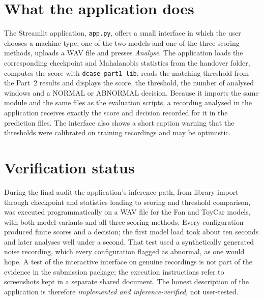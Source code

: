 \section{What the application does}
The Streamlit application, \texttt{app.py}, offers a small interface in which the user chooses a machine type, one of the two models and one of the three scoring methods, uploads a WAV file and presses \emph{Analyse}. The application loads the corresponding checkpoint and Mahalanobis statistics from the handover folder, computes the score with \texttt{dcase\_part1\_lib}, reads the matching threshold from the Part~2 results and displays the score, the threshold, the number of analysed windows and a NORMAL or ABNORMAL decision. Because it imports the same module and the same files as the evaluation scripts, a recording analysed in the application receives exactly the score and decision recorded for it in the prediction files. The interface also shows a short caption warning that the thresholds were calibrated on training recordings and may be optimistic.

\section{Verification status}
During the final audit the application's inference path, from library import through checkpoint and statistics loading to scoring and threshold comparison, was executed programmatically on a WAV file for the Fan and ToyCar models, with both model variants and all three scoring methods. Every configuration produced finite scores and a decision; the first model load took about ten seconds and later analyses well under a second. That test used a synthetically generated noise recording, which every configuration flagged as abnormal, as one would hope. A test of the interactive interface on genuine recordings is not part of the evidence in the submission package; the execution instructions refer to screenshots kept in a separate shared document. The honest description of the application is therefore \emph{implemented and inference-verified}, not user-tested.
